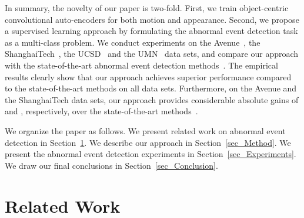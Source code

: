 \documentclass[10pt,twocolumn,letterpaper]{article}
\begin{document}
In summary, the novelty of our paper is two-fold. First, we train object-centric convolutional auto-encoders for both motion and appearance. Second, we propose a supervised learning approach by formulating the abnormal event detection task as a multi-class problem. We conduct experiments on the Avenue~\cite{Lu-ICCV-2013}, the ShanghaiTech~\cite{Luo-ICCV-2017}, the UCSD~\cite{Mahadevan-CVPR-2010} and the UMN~\cite{Mehran-CVPR-2009} data sets, and compare our approach with the state-of-the-art abnormal event detection methods~\cite{Cong-CVPR-2011,Giorno-ECCV-2016,Dutta-AAAI-2015,Hasan-CVPR-2016,Hinami-ICCV-2017,Ionescu-ICCV-2017,Ionescu-WACV-2019,Kim-CVPR-2009,Liu-CVPR-2018,Liu-BMVC-2018,Lu-ICCV-2013,Luo-ICCV-2017,Mahadevan-CVPR-2010,Mehran-CVPR-2009,Ravanbakhsh-WACV-2018,Ravanbakhsh-ICIP-2017,Sabokrou-IP-2017,Saligrama-CVPR-2012,Smeureanu-ICIAP-2017,Sultani-CVPR-2018,Xu-BMVC-2015,Xu-CVIU-2017,Zhang-PR-2016}. The empirical results clearly show that our approach achieves superior performance compared to the state-of-the-art methods on all data sets. Furthermore, on the Avenue and the ShanghaiTech data sets, our approach provides considerable absolute gains of  and , respectively, over the state-of-the-art methods~\cite{Ionescu-WACV-2019,Sultani-CVPR-2018}. 


We organize the paper as follows. We present related work on abnormal event detection in Section~\ref{sec_RelatedWork}. We describe our approach in Section~\ref{sec_Method}. We present the abnormal event detection experiments in Section~\ref{sec_Experiments}. We draw our final conclusions in Section~\ref{sec_Conclusion}.

\vspace*{-0.2cm}
\section{Related Work}
\label{sec_RelatedWork}
\vspace*{-0.1cm}
\end{document}
